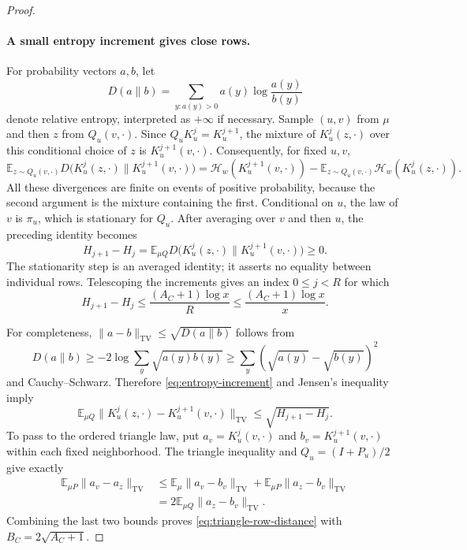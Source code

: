 \documentclass[11pt]{article}
\theoremstyle{definition}
\theoremstyle{remark}
\numberwithin{equation}{section}
\begin{document}
\begin{proof}
\paragraph{A small entropy increment gives close rows.}
For probability vectors $a,b$, let
\[
 D(a\|b)=\sum_{y:a(y)>0}a(y)\log\frac{a(y)}{b(y)}
\]
denote relative entropy, interpreted as $+\infty$ if necessary.  Sample
$(u,v)$ from $\mu$ and then $z$ from $Q_u(v,\cdot)$.  Since
$Q_uK_u^j=K_u^{j+1}$, the mixture of $K_u^j(z,\cdot)$ over this conditional
choice of $z$ is $K_u^{j+1}(v,\cdot)$.  Consequently, for fixed $u,v$,
\[
 \mathbb E_{z\sim Q_u(v,\cdot)}
 D\bigl(K_u^j(z,\cdot)\|K_u^{j+1}(v,\cdot)\bigr)
 =\mathcal H_w(K_u^{j+1}(v,\cdot))
  -\mathbb E_{z\sim Q_u(v,\cdot)}\mathcal H_w(K_u^j(z,\cdot)).
\]
All these divergences are finite on events of positive probability,
because the second argument is the mixture containing the first.
Conditional on $u$, the law of $v$ is $\pi_u$, which is stationary for
$Q_u$.  After averaging over $v$ and then $u$, the preceding identity
becomes
\begin{equation}
 H_{j+1}-H_j
 =\mathbb E_{\mu Q}
 D\bigl(K_u^j(z,\cdot)\|K_u^{j+1}(v,\cdot)\bigr)\ge0.
 \label{eq:entropy-increment}
\end{equation}
The stationarity step is an averaged identity; it asserts no equality
between individual rows.  Telescoping the increments gives an index
$0\le j<R$ for which
\[
 H_{j+1}-H_j\le\frac{(A_C+1)\log x}{R}
 \le\frac{(A_C+1)\log x}{x}.
\]

For completeness, $\|a-b\|_{\mathrm{TV}}\le\sqrt{D(a\|b)}$ follows
from
\[
 D(a\|b)\ge-2\log\sum_y\sqrt{a(y)b(y)}
 \ge\sum_y(\sqrt{a(y)}-\sqrt{b(y)})^2
\]
and Cauchy--Schwarz.  Therefore \eqref{eq:entropy-increment} and Jensen's
inequality imply
\[
 \mathbb E_{\mu Q}
 \bigl\|K_u^j(z,\cdot)-K_u^{j+1}(v,\cdot)\bigr\|_{\mathrm{TV}}
 \le\sqrt{H_{j+1}-H_j}.
\]
To pass to the ordered triangle law, put
$a_v=K_u^j(v,\cdot)$ and $b_v=K_u^{j+1}(v,\cdot)$ within each fixed
neighborhood.  The triangle inequality and $Q_u=(I+P_u)/2$ give exactly
\begin{align*}
 \mathbb E_{\mu P}\|a_v-a_z\|_{\mathrm{TV}}
 &\le\mathbb E_\mu\|a_v-b_v\|_{\mathrm{TV}}
     +\mathbb E_{\mu P}\|a_z-b_v\|_{\mathrm{TV}}\\
 &=2\mathbb E_{\mu Q}\|a_z-b_v\|_{\mathrm{TV}}.
\end{align*}
Combining the last two bounds proves \eqref{eq:triangle-row-distance}
with $B_C=2\sqrt{A_C+1}$.
\end{proof}
\end{document}
